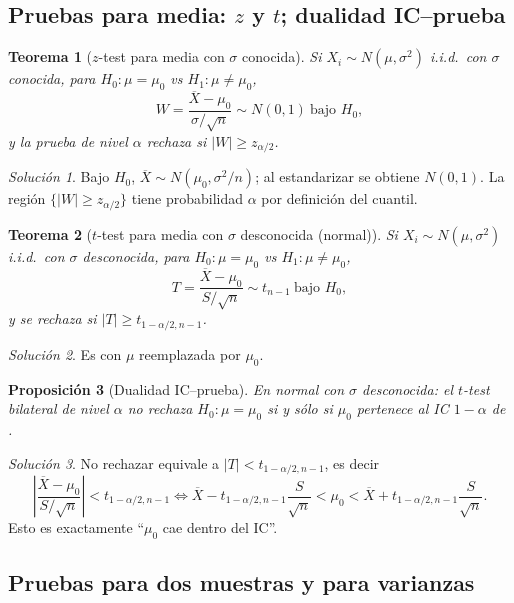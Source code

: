 \documentclass[11pt]{article}
\theoremstyle{plain}
\newtheorem{theorem}{Teorema}[section]
\newtheorem{proposition}[theorem]{Proposición}
\theoremstyle{definition}
\theoremstyle{remark}
\theoremstyle{solstyle}
\newtheorem*{solution}{Solución}
\newcommand{\1}{\mathbbm{1}}
\newcommand{\abs}[1]{\left|#1\right|}
\newcommand{\Xbar}{\overline{X}}
\begin{document}
\subsection{Pruebas para media: $z$ y $t$; dualidad IC--prueba}

\begin{theorem}[$z$-test para media con $\sigma$ conocida]\label{thm:ztest}
Si $X_i\sim N(\mu,\sigma^2)$ i.i.d.\ con $\sigma$ conocida, para $H_0:\mu=\mu_0$ vs $H_1:\mu\neq\mu_0$,
\[
W=\frac{\Xbar-\mu_0}{\sigma/\sqrt n}\sim N(0,1)\ \text{bajo }H_0,
\]
y la prueba de nivel $\alpha$ rechaza si $\abs{W}\ge z_{\alpha/2}$.
\end{theorem}

\begin{solution}
Bajo $H_0$, $\Xbar\sim N(\mu_0,\sigma^2/n)$; al estandarizar se obtiene $N(0,1)$.
La región $\{|W|\ge z_{\alpha/2}\}$ tiene probabilidad $\alpha$ por definición del cuantil.
\end{solution}

\begin{theorem}[$t$-test para media con $\sigma$ desconocida (normal)]\label{thm:ttest}
Si $X_i\sim N(\mu,\sigma^2)$ i.i.d.\ con $\sigma$ desconocida, para $H_0:\mu=\mu_0$ vs $H_1:\mu\neq\mu_0$,
\[
T=\frac{\Xbar-\mu_0}{S/\sqrt n}\sim t_{n-1}\ \text{bajo }H_0,
\]
y se rechaza si $\abs{T}\ge t_{1-\alpha/2,n-1}$.
\end{theorem}

\begin{solution}
Es  con $\mu$ reemplazada por $\mu_0$.
\end{solution}

\begin{proposition}[Dualidad IC--prueba]\label{prop:CItestDual}
En normal con $\sigma$ desconocida: el $t$-test bilateral de nivel $\alpha$ no rechaza $H_0:\mu=\mu_0$
si y sólo si $\mu_0$ pertenece al IC $1-\alpha$ de .
\end{proposition}

\begin{solution}
No rechazar equivale a $\abs{T}<t_{1-\alpha/2,n-1}$, es decir
\[
\left|\frac{\Xbar-\mu_0}{S/\sqrt n}\right|<t_{1-\alpha/2,n-1}
\iff
\Xbar-t_{1-\alpha/2,n-1}\frac{S}{\sqrt n}<\mu_0<\Xbar+t_{1-\alpha/2,n-1}\frac{S}{\sqrt n}.
\]
Esto es exactamente ``$\mu_0$ cae dentro del IC''.
\end{solution}

\subsection{Pruebas para dos muestras y para varianzas}
\end{document}
